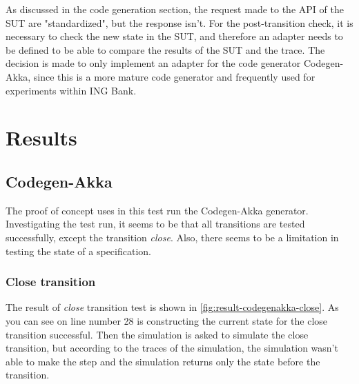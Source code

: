As discussed in the code generation section, the request made to the API of the SUT are "standardized", but the response isn't. For the post-transition check, it is necessary to check the new state in the SUT, and therefore an adapter needs to be defined to be able to compare the results of the SUT and the trace. The decision is made to only implement an adapter for the code generator Codegen-Akka, since this is a more mature code generator and frequently used for experiments within ING Bank.



\section{Results}

\subsection{Codegen-Akka}
The proof of concept uses in this test run the Codegen-Akka generator. Investigating the test run, it seems to be that all transitions are tested successfully, except the transition \textit{close}. Also, there seems to be a limitation in testing the state of a specification.

\subsubsection{Close transition}
\label{sec:close-no-test-codegenakka}

The result of \textit{close} transition test is shown in \autoref{fig:result-codegenakka-close}. As you can see on line number 28 is constructing the current state for the close transition successful. Then the simulation is asked to simulate the close transition, but according to the traces of the simulation, the simulation wasn't able to make the step and the simulation returns only the state before the transition.

